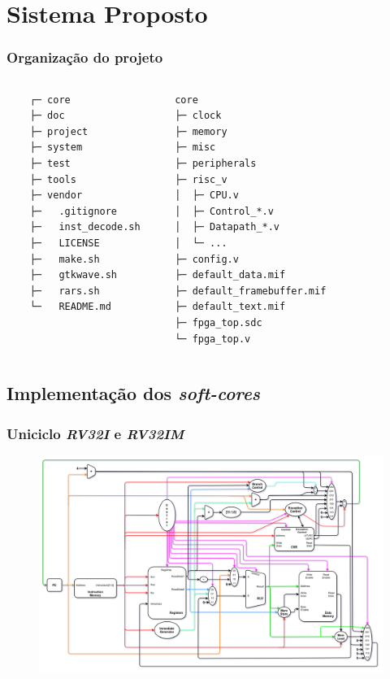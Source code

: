 \documentclass[aspectratio=169]{beamer}
\begin{document}
\section{Sistema Proposto}
    \begin{frame}[fragile]
        \frametitle{Organização do projeto}
        \footnotesize{
        \begin{columns}
            \begin{verbatim}
    ┌─ core
    ├─ doc
    ├─ project
    ├─ system
    ├─ test
    ├─ tools
    ├─ vendor
    ├─   .gitignore
    ├─   inst_decode.sh
    ├─   LICENSE
    ├─   make.sh
    ├─   gtkwave.sh
    ├─   rars.sh
    └─   README.md
        \end{verbatim}
        \vfill
        \begin{verbatim}
   core
   ├─ clock
   ├─ memory
   ├─ misc
   ├─ peripherals
   ├─ risc_v
   │  ├─ CPU.v
   │  ├─ Control_*.v
   │  ├─ Datapath_*.v
   │  └─ ...
   ├─ config.v
   ├─ default_data.mif
   ├─ default_framebuffer.mif
   ├─ default_text.mif
   ├─ fpga_top.sdc
   └─ fpga_top.v
        \end{verbatim}
        \vfill
        \end{columns}}
    \end{frame}

    \subsection{Implementação dos \textit{soft-cores}}
    \begin{frame}
        \frametitle{Uniciclo \textit{RV32I} e \textit{RV32IM}}
        \vfill
        \begin{figure}[H]
        \centering
            \includegraphics[width=.9\textwidth,height=.85\textheight,keepaspectratio]
            {../images/uarch_diagrams/singlecycle-RV32I-RV32IM.png}
        \end{figure}
        \vfill
    \end{frame}
\end{document}
